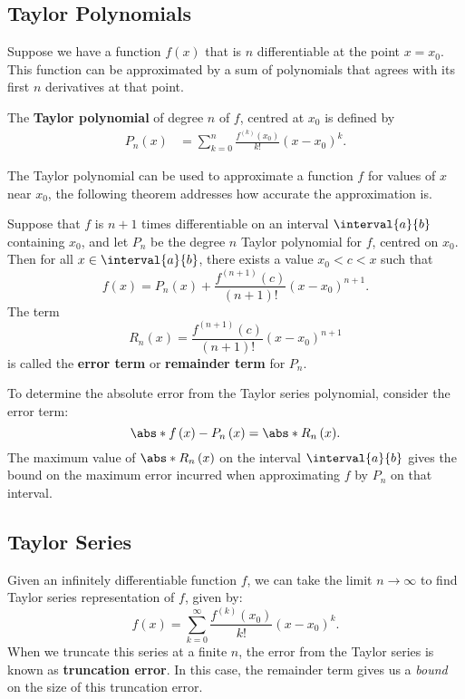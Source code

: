\documentclass{article}
\begin{document}
\subsection{Taylor Polynomials}
Suppose we have a function \(f\left( x \right)\) that is \(n\)
differentiable at the point \(x = x_0\). This function can be
approximated by a sum of polynomials that agrees with its first \(n\)
derivatives at that point.
\begin{definition}
    The \textbf{Taylor polynomial} of degree \(n\) of \(f\), centred at
    \(x_0\) is defined by
    \begin{align*}
        P_n\left( x \right) & = \sum_{k = 0}^n \frac{f^{\left( k \right)}\left( x_0 \right)}{k!} \left( x - x_0 \right)^k.
    \end{align*}
\end{definition}
The Taylor polynomial can be used to approximate a function \(f\) for
values of \(x\) near \(x_0\), the following theorem addresses how
accurate the approximation is.
\begin{definition}
    Suppose that \(f\) is \(n + 1\) times differentiable on an interval
    \(\interval{a}{b}\) containing \(x_0\), and let \(P_n\) be the
    degree \(n\) Taylor polynomial for \(f\), centred on \(x_0\). Then
    for all \(x \in \interval{a}{b}\), there exists a value
    \(x_0 < c < x\) such that
    \begin{equation*}
        f\left( x \right) = P_n\left( x \right) + \frac{f^{\left( n + 1 \right)}\left( c \right)}{\left( n + 1 \right)!} \left( x - x_0 \right)^{n + 1}.
    \end{equation*}
    The term
    \begin{equation*}
        R_n\left( x \right) = \frac{f^{\left( n + 1 \right)}\left( c \right)}{\left( n + 1 \right)!} \left( x - x_0 \right)^{n + 1}
    \end{equation*}
    is called the \textbf{error term} or \textbf{remainder term} for
    \(P_n\).
\end{definition}
To determine the absolute error from the Taylor series polynomial,
consider the error term:
\begin{equation*}
    \abs*{f\left( x \right) - P_n\left( x \right)} = \abs*{R_n\left( x \right)}.
\end{equation*}
The maximum value of \(\abs*{R_n\left( x \right)}\) on the interval
\(\interval{a}{b}\) gives the bound on the maximum error incurred when
approximating \(f\) by \(P_n\) on that interval.
\subsection{Taylor Series}
Given an infinitely differentiable function \(f\), we can take the
limit \(n \to \infty\) to find Taylor series representation of \(f\),
given by:
\begin{equation*}
    f\left( x \right) = \sum_{k = 0}^\infty \frac{f^{\left( k \right)}\left( x_0 \right)}{k!} \left( x - x_0 \right)^k.
\end{equation*}
When we truncate this series at a finite \(n\), the error from the
Taylor series is known as \textbf{truncation error}. In this case, the
remainder term gives us a \textit{bound} on the size of this truncation
error.
\end{document}
